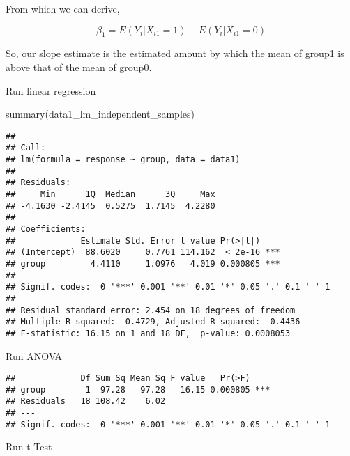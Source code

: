 \documentclass[
]{book}
\newenvironment{Shaded}{\begin{snugshade}}{\end{snugshade}}
\newcommand{\AttributeTok}[1]{\textcolor[rgb]{0.77,0.63,0.00}{#1}}
\newcommand{\FunctionTok}[1]{\textcolor[rgb]{0.00,0.00,0.00}{#1}}
\newcommand{\NormalTok}[1]{#1}
\newcommand{\OtherTok}[1]{\textcolor[rgb]{0.56,0.35,0.01}{#1}}
\newcommand{\SpecialCharTok}[1]{\textcolor[rgb]{0.00,0.00,0.00}{#1}}
\begin{document}
From which we can derive,

\[
\beta_1 = E(Y_i|X_{i1}=1) - E(Y_i|X_{i1}=0)
\]

So, our slope estimate is the estimated amount by which the mean of
group1 is above that of the mean of group0.

Run linear regression

\begin{Shaded}
\begin{Highlighting}[]
\FunctionTok{summary}\NormalTok{(data1\_lm\_independent\_samples)}
\end{Highlighting}
\end{Shaded}

\begin{verbatim}
## 
## Call:
## lm(formula = response ~ group, data = data1)
## 
## Residuals:
##     Min      1Q  Median      3Q     Max 
## -4.1630 -2.4145  0.5275  1.7145  4.2280 
## 
## Coefficients:
##             Estimate Std. Error t value Pr(>|t|)    
## (Intercept)  88.6020     0.7761 114.162  < 2e-16 ***
## group         4.4110     1.0976   4.019 0.000805 ***
## ---
## Signif. codes:  0 '***' 0.001 '**' 0.01 '*' 0.05 '.' 0.1 ' ' 1
## 
## Residual standard error: 2.454 on 18 degrees of freedom
## Multiple R-squared:  0.4729, Adjusted R-squared:  0.4436 
## F-statistic: 16.15 on 1 and 18 DF,  p-value: 0.0008053
\end{verbatim}

Run ANOVA

\begin{Shaded}
\end{Shaded}

\begin{verbatim}
##             Df Sum Sq Mean Sq F value   Pr(>F)    
## group        1  97.28   97.28   16.15 0.000805 ***
## Residuals   18 108.42    6.02                     
## ---
## Signif. codes:  0 '***' 0.001 '**' 0.01 '*' 0.05 '.' 0.1 ' ' 1
\end{verbatim}

Run t-Test
\end{document}
